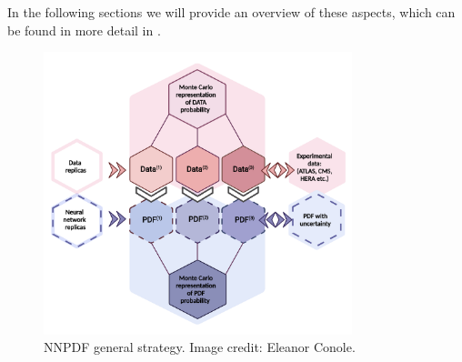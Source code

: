 In the following sections we will provide an overview of these aspects, which can be found in more detail in \cite{Ball:2010de, Ball:2012cx, Ball:2017nwa}.
\begin{figure}[H]
\centering
\includegraphics[width=0.8\textwidth]{background/eleanor_strategy.pdf}
\caption{NNPDF general strategy. Image credit: Eleanor Conole.}
\label{fig:generalstrategy}
\end{figure}

